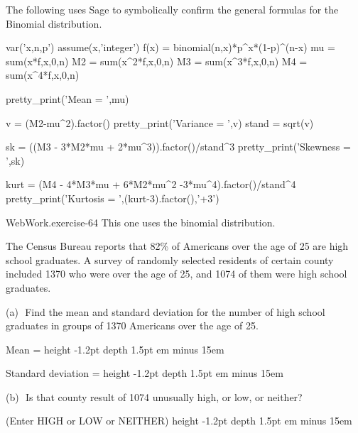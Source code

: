 \documentclass[10pt,]{book}
\newcommand{\fillin}[1]{\leavevmode\leaders\vrule height -1.2pt depth 1.5pt \hskip #1em minus #1em \null}
\numberwithin{equation}{section}
\begin{document}
%
\par
\hypertarget{p-916}{}%
The following uses Sage to symbolically confirm the general formulas for the Binomial distribution.%
\par
\hypertarget{p-917}{}%
\leavevmode%
\begin{sageinput}
var('x,n,p')
assume(x,'integer')
f(x) = binomial(n,x)*p^x*(1-p)^(n-x)
mu = sum(x*f,x,0,n)
M2 = sum(x^2*f,x,0,n)
M3 = sum(x^3*f,x,0,n)
M4 = sum(x^4*f,x,0,n)

pretty_print('Mean = ',mu)

v = (M2-mu^2).factor()
pretty_print('Variance = ',v)
stand = sqrt(v)

sk = ((M3 - 3*M2*mu + 2*mu^3)).factor()/stand^3
pretty_print('Skewness = ',sk)

kurt = (M4 - 4*M3*mu + 6*M2*mu^2 -3*mu^4).factor()/stand^4
pretty_print('Kurtosis = ',(kurt-3).factor(),'+3')
\end{sageinput}
%
\par
\hypertarget{p-918}{}%
\begin{inlineexercise}{WebWork.}{exercise-64}%
\hypertarget{p-919}{}%
This one uses the binomial distribution.%
\par\medskip
\hypertarget{p-920}{}%
The Census Bureau reports that 82\% of Americans over the age of 25 are high school graduates. A survey of randomly selected residents of certain county included 1370 who were over the age of 25, and 1074 of them were high school graduates.%
\par
\hypertarget{p-921}{}%
(a) \(\) Find the mean and standard deviation for the number of high school graduates in groups of 1370 Americans over the age of 25.%
\par
\hypertarget{p-922}{}%
Mean =  \fillin{15}%
\par
\hypertarget{p-923}{}%
Standard deviation =  \fillin{15}%
\par
\hypertarget{p-924}{}%
(b) \(\) Is that county result of 1074 unusually high, or low, or neither?%
\par
\hypertarget{p-925}{}%
(Enter HIGH or LOW or NEITHER)  \fillin{15}%
\end{inlineexercise}
%
\par
\hypertarget{p-926}{}%
\leavevmode%
\end{document}
